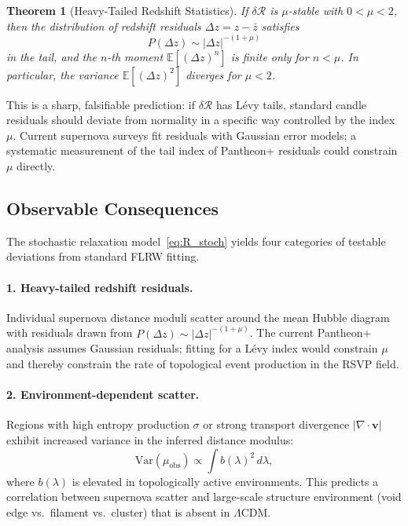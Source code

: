 \documentclass[12pt,a4paper]{article}
\newtheorem{theorem}{Theorem}[section]
\theoremstyle{remark}
\newcommand{\vv}{\mathbf{v}}
\newcommand{\Rcal}{\mathcal{R}}
\begin{document}
\begin{theorem}[Heavy-Tailed Redshift Statistics]
\label{thm:levy}
If $\delta\Rcal$ is $\mu$-stable with $0 < \mu < 2$, then the distribution
of redshift residuals $\Delta z = z - \bar{z}$ satisfies
\begin{equation}
P(\Delta z) \sim |\Delta z|^{-(1+\mu)}
\end{equation}
in the tail, and the $n$-th moment $\mathbb{E}[(\Delta z)^n]$ is finite only
for $n < \mu$. In particular, the variance $\mathbb{E}[(\Delta z)^2]$ diverges
for $\mu < 2$.
\end{theorem}

This is a sharp, falsifiable prediction: if $\delta\Rcal$ has L\'{e}vy tails,
standard candle residuals should deviate from normality in a specific way
controlled by the index $\mu$. Current supernova surveys fit residuals with
Gaussian error models; a systematic measurement of the tail index of Pantheon+
residuals could constrain $\mu$ directly.

\subsection{Observable Consequences}

The stochastic relaxation model~\eqref{eq:R_stoch} yields four categories of
testable deviations from standard FLRW fitting.

\paragraph{1. Heavy-tailed redshift residuals.}
Individual supernova distance moduli scatter around the mean Hubble diagram with
residuals drawn from $P(\Delta z) \sim |\Delta z|^{-(1+\mu)}$. The current
Pantheon+ analysis assumes Gaussian residuals; fitting for a L\'{e}vy index
would constrain $\mu$ and thereby constrain the rate of topological event
production in the RSVP field.

\paragraph{2. Environment-dependent scatter.}
Regions with high entropy production $\sigma$ or strong transport divergence
$|\nabla\cdot\vv|$ exhibit increased variance in the inferred distance modulus:
\begin{equation}
\mathrm{Var}(\mu_{\mathrm{obs}}) \propto \int b(\lambda)^2\,d\lambda,
\end{equation}
where $b(\lambda)$ is elevated in topologically active environments. This
predicts a correlation between supernova scatter and large-scale structure
environment (void edge vs.\ filament vs.\ cluster) that is absent in $\Lambda$CDM.
\end{document}
